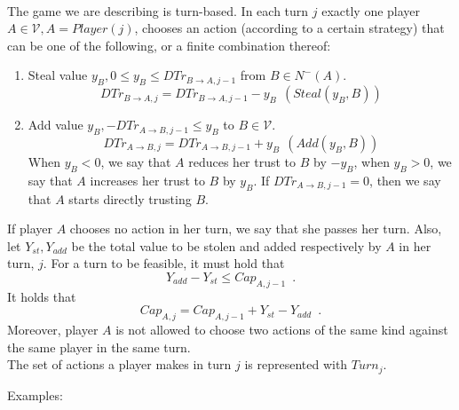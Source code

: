 \documentclass[11pt]{llncs}
\begin{document}
     \begin{definition}[Turns] \ \\
        The game we are describing is turn-based. In each turn $j$ exactly one player $A \in \mathcal{V}, A =
        Player\left(j\right)$, chooses an action (according to a certain strategy) that can be one of the following, or a
        finite combination thereof:
        \begin{enumerate}
           \item Steal value $y_B, 0 \leq y_B \leq DTr_{B \rightarrow A, j-1}$ from $B \in N^{-}\left(A\right)$.
           \begin{equation}
              DTr_{B \rightarrow A, j} = DTr_{B \rightarrow A, j-1} - y_B \:\: \left(Steal\left(y_B, B\right)\right)
           \end{equation}
           \item Add value $y_B, -DTr_{A \rightarrow B, j-1} \leq y_B$ to $B \in \mathcal{V}$.
           \begin{equation}
              DTr_{A \rightarrow B, j} = DTr_{A \rightarrow B, j-1} + y_B \:\: \left(Add\left(y_B, B\right)\right)
           \end{equation}
           When $y_B < 0$, we say that $A$ reduces her trust to $B$ by $-y_B$, when $y_B > 0$, we say that $A$ increases her
           trust to $B$ by $y_B$. If $DTr_{A \rightarrow B, j-1} = 0$, then we say that $A$ starts directly trusting $B$.
        \end{enumerate}
        If player $A$ chooses no action in her turn, we say that she passes her turn. Also, let $Y_{st}, Y_{add}$ be the
        total value to be stolen and added respectively by $A$ in her turn, $j$. For a turn to be feasible, it must hold
        that
        \begin{equation}
           Y_{add} - Y_{st} \leq Cap_{A, j-1} \enspace.
        \end{equation}
        It holds that
        \begin{equation}
           Cap_{A, j} = Cap_{A, j-1} + Y_{st} - Y_{add} \enspace.
        \end{equation}
        Moreover, player $A$ is not allowed to choose two actions of the same kind against the same player in the same turn.
        \\ The set of actions a player makes in turn $j$ is represented with $Turn_j$.
     \end{definition}
     Examples:
\end{document}
